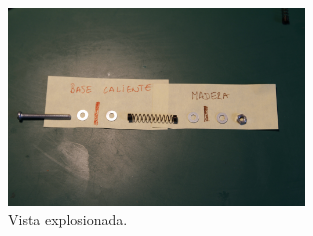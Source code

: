 		  \begin{figure}[H]
		        \centering
		        \includegraphics[width=0.7\textwidth]{../../Fotos/35.jpg}
		        \caption{Vista explosionada.}
		        \label{fig:colocacion.heatbed}
		    \end{figure}

